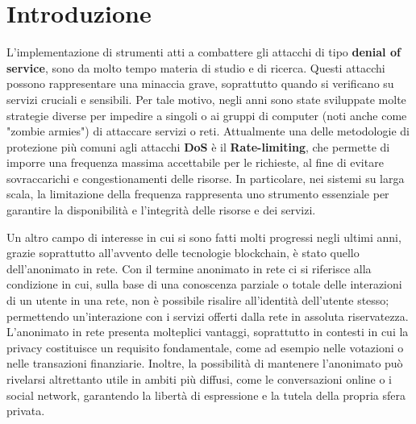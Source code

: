 \chapter*{Introduzione}
\label{chap:introduction}

L’implementazione di strumenti atti a combattere gli attacchi di tipo \textbf{denial of service}, sono da molto
tempo materia di studio e di ricerca. Questi attacchi possono rappresentare una minaccia grave, soprattutto quando si
verificano su servizi cruciali e sensibili. Per tale motivo, negli anni sono state sviluppate molte strategie diverse
per impedire a singoli o ai gruppi di computer (noti anche come "zombie armies") di attaccare servizi o reti.
Attualmente una delle metodologie di protezione più comuni agli attacchi \textbf{DoS} è il \textbf{Rate-limiting}, che permette
di imporre una frequenza massima accettabile per le richieste, al fine di evitare sovraccarichi e congestionamenti delle
risorse. In particolare, nei sistemi su larga scala, la limitazione della frequenza rappresenta uno strumento essenziale
per garantire la disponibilità e l'integrità delle risorse e dei servizi.

Un altro campo di interesse in cui si sono fatti molti progressi negli ultimi anni, grazie soprattutto all'avvento delle
tecnologie blockchain, è stato quello dell’anonimato in rete. Con il termine anonimato in rete ci si riferisce alla
condizione in cui, sulla base di una conoscenza parziale o totale delle interazioni di un utente in una rete, non è
possibile risalire all'identità dell'utente stesso; permettendo un'interazione con i servizi offerti dalla rete in
assoluta riservatezza. L'anonimato in rete presenta molteplici vantaggi, soprattutto in contesti in cui la privacy
costituisce un requisito fondamentale, come ad esempio nelle votazioni o nelle transazioni finanziarie. Inoltre, la
possibilità di mantenere l'anonimato può rivelarsi altrettanto utile in ambiti più diffusi, come le conversazioni online
o i social network, garantendo la libertà di espressione e la tutela della propria sfera privata.

